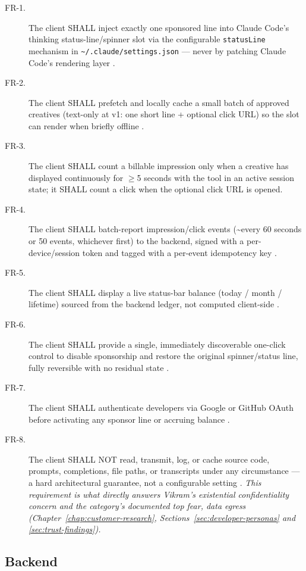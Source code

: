 \begin{description}
\item[FR-1.] The client SHALL inject exactly one sponsored line into Claude Code's thinking status-line/spinner slot via the configurable \texttt{statusLine} mechanism in \texttt{\textasciitilde/.claude/settings.json} --- never by patching Claude Code's rendering layer \cite{mvpspec_2026,masterplan_2026}.
\item[FR-2.] The client SHALL prefetch and locally cache a small batch of approved creatives (text-only at v1: one short line + optional click URL) so the slot can render when briefly offline \cite{mvpspec_2026}.
\item[FR-3.] The client SHALL count a billable impression only when a creative has displayed continuously for $\geq$5 seconds \cite{masterplan_2026} with the tool in an active session state; it SHALL count a click when the optional click URL is opened.
\item[FR-4.] The client SHALL batch-report impression/click events (\textasciitilde every 60 seconds or 50 events, whichever first) to the backend, signed with a per-device/session token and tagged with a per-event idempotency key \cite{mvpspec_2026}.
\item[FR-5.] The client SHALL display a live status-bar balance (today / month / lifetime) sourced from the backend ledger, not computed client-side \cite{mvpspec_2026,prd_2026}.
\item[FR-6.] The client SHALL provide a single, immediately discoverable one-click control to disable sponsorship and restore the original spinner/status line, fully reversible with no residual state \cite{mvpspec_2026,prd_2026}.
\item[FR-7.] The client SHALL authenticate developers via Google or GitHub OAuth before activating any sponsor line or accruing balance \cite{mvpspec_2026}.
\item[FR-8.] The client SHALL NOT read, transmit, log, or cache source code, prompts, completions, file paths, or transcripts under any circumstance --- a hard architectural guarantee, not a configurable setting \cite{mvpspec_2026,prd_2026}. \emph{This requirement is what directly answers Vikram's existential confidentiality concern and the category's documented top fear, data egress (Chapter~\ref{chap:customer-research}, Sections~\ref{sec:developer-personas} and \ref{sec:trust-findings}).}
\end{description}

\subsection{Backend}

